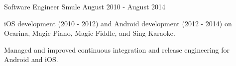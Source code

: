 \begin{cventries}
  \cventry
    {Software Engineer} %
    {Smule} %
    {} %
    {August 2010 - August 2014} %
    {
      \begin{cvitems} %
       \item {iOS development (2010 - 2012) and Android development (2012 - 2014) on Ocarina, Magic Piano, Magic Fiddle, and Sing Karaoke.}
       \item {Managed and improved continuous integration and release engineering for Android and iOS.}
      \end{cvitems}
    }
    

\end{cventries}
